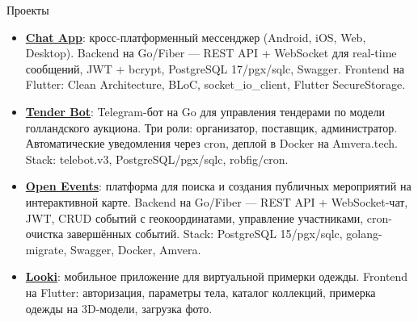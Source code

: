 \documentclass{style} %
\begin{document}
\begin{rSection}{Проекты}

\begin{itemize}
    \itemsep -3pt {}
     \item \href{https://github.com/MaximovIlya/chat_app.git}{\textbf{Chat App}}: кросс-платформенный мессенджер (Android, iOS, Web, Desktop). Backend на Go/Fiber — REST API + WebSocket для real-time сообщений, JWT + bcrypt, PostgreSQL 17/pgx/sqlc, Swagger. Frontend на Flutter: Clean Architecture, BLoC, socket\_io\_client, Flutter SecureStorage.
     \item \href{https://github.com/MaximovIlya/tender_bot_go}{\textbf{Tender Bot}}: Telegram-бот на Go для управления тендерами по модели голландского аукциона. Три роли: организатор, поставщик, администратор. Автоматические уведомления через cron, деплой в Docker на Amvera.tech. Stack: telebot.v3, PostgreSQL/pgx/sqlc, robfig/cron.
     \item \href{https://github.com/OpenEventsMap/OpenEventsBackend}{\textbf{Open Events}}: платформа для поиска и создания публичных мероприятий на интерактивной карте. Backend на Go/Fiber — REST API + WebSocket-чат, JWT, CRUD событий с геокоординатами, управление участниками, cron-очистка завершённых событий. Stack: PostgreSQL 15/pgx/sqlc, golang-migrate, Swagger, Docker, Amvera.
     \item \href{https://github.com/IU-Capstone-Project-2025/Looki}{\textbf{Looki}}: мобильное приложение для виртуальной примерки одежды. Frontend на Flutter: авторизация, параметры тела, каталог коллекций, примерка одежды на 3D-модели, загрузка фото. 
\end{itemize}

\end{rSection}

\end{document}
